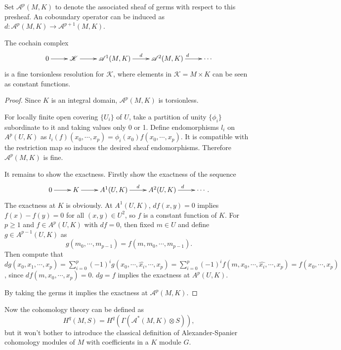 \documentclass[twoside]{article}
\begin{document}
Set $\mathscr {A}^p(M,K)$ to denote the associated sheaf of germs with respect to this presheaf. An coboundary operator  can be induced as $d:\mathscr {A}^p(M,K)\to \mathscr {A}^{p+1}(M,K)$.

 \begin{lemma}\label{fine}

The  cochain complex
\begin{equation*}\xymatrix{
 0\ar[r]& \mathscr {K}\ar[r]& \mathscr {A}^1(M,K)\ar[r]^d &\mathscr {A}^2(M,K)\ar[r]^d&\cdots
 }
\end{equation*}
is a fine torsionless resolution for $\mathscr{K}$,
where  elements in $\mathscr {K}=M\times K$ can be seen as constant functions.
 \end{lemma}


 \begin{proof}
  Since $K$ is an integral domain, $\mathscr {A}^p(M,K)$ is torsionless.

  For locally finite open covering $\{U_i\}$ of $U$,  take a partition of unity $\{\phi_i\}$ subordinate to it and taking values only 0 or 1. Define  endomorphisms $l_i$ on $A^p(U,K)$ as $l_i(f)(x_0,\cdots,x_{p})=\phi_i(x_0)f(x_0,\cdots,x_{p})$. It is compatible with the restriction map so induces the desired sheaf endomorphisms. Therefore $\mathscr {A}^p(M,K)$ is fine.

  It remains to show the exactness. Firstly show the exactness of the sequence \begin{equation*}\xymatrix{
 0\ar[r]& K\ar[r]& A^1(U,K)\ar[r]^d &A^2(U,K)\ar[r]^d&\cdots.
 }
\end{equation*}
The exactness at $K$  is obviously. At $A^1(U,K)$, $df(x,y)=0$ implies $f(x)-f(y)=0$ for all $(x,y)\in U^2$, so $f$ is a constant function of $K$. For $p\geq 1$ and $f\in A^p(U,K)$ with $df=0$, then fixed $m\in U$ and define $g\in A^{p-1}(U,K)$ as $$
g(m_0,\cdots,m_{p-1})=f(m,m_0,\cdots,m_{p-1}).
$$
Then compute that $dg(x_0,x_1,\cdots,x_p)=\sum_{i=0}^p(-1)^ig(x_0,\cdots,\hat{x_i},\cdots,x_p)=\sum_{i=0}^p(-1)^if(m,x_0,\cdots,\hat{x_i},\cdots,x_p)
=f(x_0,\cdots,x_p)$, since $df(m,x_0,\cdots,x_p)=0$. $dg=f$ implies the exactness at $A^p(U,K)$.

By taking the germs it implies the exactness at  $\mathscr {A}^p(M,K)$.
\end{proof}

Now the cohomology theory can be defined as $$
H^q(M,S)=H^q(\Gamma(\mathscr {A}^*(M,K)\otimes S)),
$$
 but it won't bother to introduce the classical definition of Alexander-Spanier cohomology modules of $M$ with coefficients in a $K$ module $G$.
\end{document}
